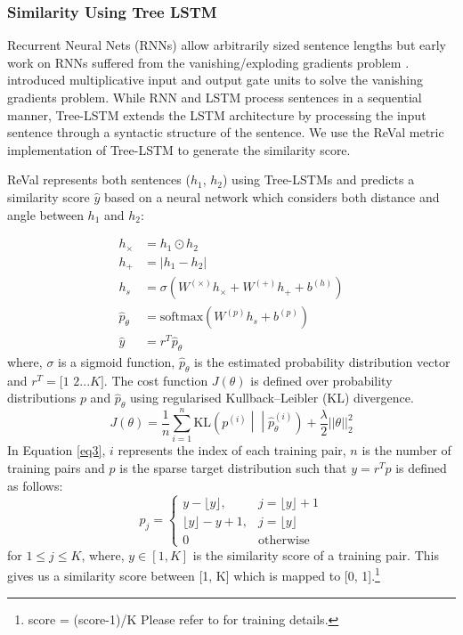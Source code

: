 \subsubsection{Similarity Using Tree LSTM}
Recurrent Neural Nets (RNNs) allow arbitrarily sized sentence lengths \citep{elman1990finding} but early work on RNNs suffered from the vanishing/exploding gradients problem \citep{bengio1994learning}. \cite{hochreiter1997long} introduced multiplicative input and output gate units to solve the vanishing gradients problem. While RNN and LSTM process sentences in a sequential manner, Tree-LSTM extends the LSTM architecture by processing the input sentence through a syntactic structure of the sentence. We use the ReVal metric \citep{reval2015} implementation of Tree-LSTM \citep{tai-socher-manning:2015}  to generate the similarity score.

ReVal represents both sentences ($h_{1}$, $h_{2}$) using Tree-LSTMs and predicts a similarity score $\hat{y}$ based on a neural network which considers both distance and angle between $h_{1}$ and $h_{2}$:

\begin{equation}
\label{eq2}
\begin{split}
h_{\times} & =h_{1}\odot h_{2}
\\ 
h_+ & =|h_{1}-h_{2}| 
\\
h_s & =\sigma\left(W^{(\times)}h_{\times} + W^{(+)}h_+ +b^{(h)}\right)
\\
\hat{p}_{\theta} & = \text{softmax} \left(W^{(p)}h_s + b^{(p)}\right)
\\
\hat{y} & =r^T\hat{p}_{\theta}
\end{split}
\end{equation}
where, $\sigma$ is a sigmoid function, $\hat{p}_\theta$ is the estimated probability distribution vector and $r^T=[1$ $2 ... K]$. 
The cost function $J(\theta)$ is defined over probability distributions $p$ and $\hat{p}_{\theta}$  using regularised Kullback–Leibler (KL) divergence. 
\begin{equation}
\label{eq3}
J(\theta)  = \frac{1}{n} \sum_{i=1}^{n} \text{KL}\left(p^{(i)}\middle|\middle|\hat{p}_{\theta}^{(i)}\right) + \frac{\lambda}{2}{||\theta||}_2^2
\end{equation}
In Equation \ref{eq3}, $i$ represents the index of each training pair, $n$ is the number of training pairs and $p$ is the sparse target distribution such that $y=r^Tp$ is defined as follows:
\[
    p_j= 
\begin{cases}
    y- \lfloor{y\rfloor},& j = \lfloor{y\rfloor} + 1\\
    \lfloor{y\rfloor} -y +1, & j = \lfloor{y\rfloor}\\
    0              & \text{otherwise}
\end{cases}
\]
for $1\le j \le K$, where, $y\in[1, K]$ is the similarity score of a training pair. This gives us a similarity score between [1, K] which is mapped to [0, 1].\footnote{score = (score-1)/K Please refer to \cite{reval2015} for training details.}

